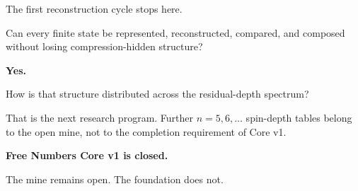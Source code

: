 \documentclass[11pt,a4paper]{article}
\begin{document}
The first reconstruction cycle stops here.

\begin{resultbox}
\centering
Can every finite state be represented, reconstructed, compared, and composed\\
without losing compression-hidden structure?
\end{resultbox}

\begin{center}
\Large\bfseries Yes.
\end{center}

\begin{scopebox}
\centering
How is that structure distributed across the residual-depth spectrum?
\end{scopebox}

That is the next research program. Further $n=5,6,\ldots$ spin-depth tables belong to the open mine, not to the completion requirement of Core v1.

\vfill
\begin{tcolorbox}[
  colback=deepblue,
  colframe=deepblue,
  boxrule=0pt,
  arc=2mm,
  left=5mm,right=5mm,top=6mm,bottom=6mm
]
\centering
{\Large\bfseries\color{white} Free Numbers Core v1 is closed.\par}
\vspace{3mm}
{\large\color{white} The mine remains open. The foundation does not.\par}
\end{tcolorbox}
\end{document}
